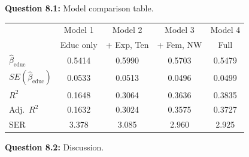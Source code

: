 \documentclass[11pt,letterpaper]{article}
\begin{document}
\textbf{Question 8.1:} Model comparison table.

\begin{answer}
\begin{center}
\begin{tabular}{l|cccc}
\toprule
 & Model 1 & Model 2 & Model 3 & Model 4 \\
 & Educ only & + Exp, Ten & + Fem, NW & Full \\
\midrule
$\hat{\beta}_{\text{educ}}$ & 0.5414 & 0.5990 & 0.5703 & 0.5479 \\[4pt]
$SE(\hat{\beta}_{\text{educ}})$ & 0.0533 & 0.0513 & 0.0496 & 0.0499 \\[4pt]
$R^2$ & 0.1648 & 0.3064 & 0.3636 & 0.3835 \\[4pt]
Adj.\ $R^2$ & 0.1632 & 0.3024 & 0.3575 & 0.3727 \\[4pt]
SER & 3.378 & 3.085 & 2.960 & 2.925 \\
\bottomrule
\end{tabular}
\end{center}
\end{answer}

\textbf{Question 8.2:} Discussion.
\end{document}
